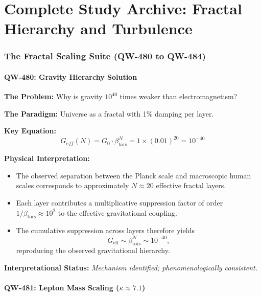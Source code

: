 \documentclass[11pt,a4paper]{book}
\theoremstyle{remark}
\newcommand{\betators}{\beta_{\text{tors}}}
\begin{document}
\part{Complete Study Archive: Fractal Hierarchy and Turbulence}

\section{The Fractal Scaling Suite (QW-480 to QW-484)}

\subsection{QW-480: Gravity Hierarchy Solution}

\textbf{The Problem:} Why is gravity $10^{40}$ times weaker than electromagnetism?

\textbf{The Paradigm:} Universe as a fractal with 1\% damping per layer.

\textbf{Key Equation:}
\begin{equation}
G_{eff}(N) = G_0 \cdot \betators^N = 1 \times (0.01)^{20} = 10^{-40}
\end{equation}

\textbf{Physical Interpretation:}
\begin{itemize}
    \item The observed separation between the Planck scale and macroscopic human scales corresponds to approximately $N \approx 20$ effective fractal layers.
    \item Each layer contributes a multiplicative suppression factor of order $1/\betators \approx 10^{2}$ to the effective gravitational coupling.
    \item The cumulative suppression across layers therefore yields
    \begin{equation}
        G_{\mathrm{eff}} \sim \betators^{N} \sim 10^{-40},
    \end{equation}
    reproducing the observed gravitational hierarchy.
\end{itemize}

\textbf{Interpretational Status:} \emph{Mechanism identified; phenomenologically consistent.}

\subsection{QW-481: Lepton Mass Scaling ($\kappa \approx 7.1$)}
\end{document}
